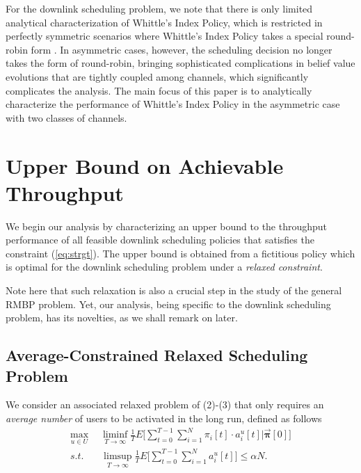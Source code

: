 \documentclass[11pt,twocolumn]{IEEEtran}
\begin{document}
For the downlink scheduling problem, we note that there is only limited analytical characterization of Whittle's Index Policy, which is restricted in perfectly symmetric scenarios where Whittle's Index Policy takes a special round-robin form \cite{Zhao_index}. In asymmetric cases, however, the scheduling decision no longer takes the form of round-robin, bringing sophisticated complications in belief value evolutions that are tightly coupled among channels, which significantly complicates the analysis. The main focus of this paper is to analytically characterize the performance of Whittle's Index Policy in the asymmetric case with two classes of channels.

\section{Upper Bound on Achievable Throughput}
\label{sec:bound}

We begin our analysis by characterizing an upper bound to the throughput performance of all feasible downlink scheduling policies that satisfies the constraint (\ref{eq:strgt}). The upper bound is obtained from a fictitious policy which is optimal for the downlink scheduling problem under a \emph{relaxed constraint}.

Note here that such relaxation is also a crucial step in the study
of the general RMBP problem. Yet, our analysis, being specific to
the downlink scheduling problem, has its novelties, as we shall
remark on later.

\subsection{Average-Constrained Relaxed Scheduling Problem}

We consider an associated relaxed problem of (2)-(3) that only requires an \emph{average number} of users to be activated in the long run, defined as follows
\begin{align}
\max_{u \in U}& \hspace{5pt} \liminf_{T\rightarrow \infty} \frac{1}{T} E\Big[\sum_{t=0}^{T-1} \sum_{i=1}^N \pi_i[t] \cdot a^u_i[t] \Big | \vec{\bm \pi}[0] \Big] \label{eq:relaxed_obj} \\
s.t.& \hspace{6pt}  \limsup_{T\rightarrow \infty} \frac{1}{T}E\Big[\sum_{t=0}^{T-1} \sum_{i=1}^{N} a^u_i[t] \Big ]\leq \alpha N . \label{eq:relaxed}
\end{align}
\end{document}
